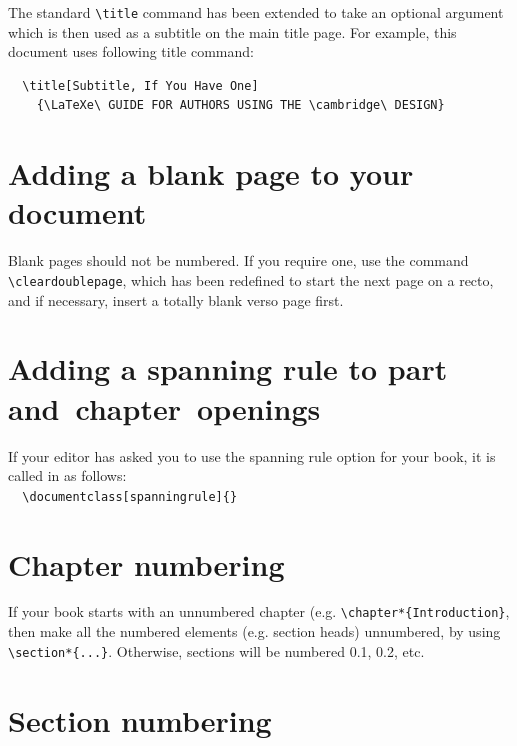 The standard \verb"\title" command has been extended to take an optional argument which is then used as a subtitle on the main title page. For example, this document uses following title command:
\begin{verbatim}
  \title[Subtitle, If You Have One]
    {\LaTeXe\ GUIDE FOR AUTHORS USING THE \cambridge\ DESIGN}
\end{verbatim}


\section{Adding a blank page to your document}

Blank pages should not be numbered. If you require one, use the command \verb"\cleardoublepage", which has been redefined to start the next page on a recto, and if necessary, insert a totally blank verso page first.

\section{Adding a spanning rule to part and~chapter~openings}

If your editor has asked you to use the spanning rule option for your book, it is called in as follows:\\[0.5\baselineskip]
\verb"  \documentclass[spanningrule]{"\texttt{\cambridge}\verb"}"

\section{Chapter numbering}
If your book starts with an unnumbered chapter (e.g. \verb"\chapter*{Introduction}", then make all the numbered elements (e.g. section heads) unnumbered, by using \verb"\section*{...}". Otherwise, sections will be numbered 0.1, 0.2, etc.

\section{Section numbering}

